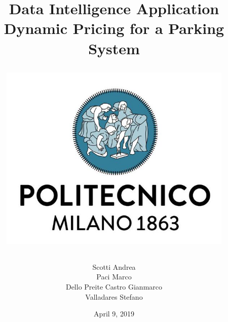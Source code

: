 \documentclass[12pt, a4paper]{article}
\begin{document}

\title{Data Intelligence Application\\ \vspace{1em}  {\textbf{Dynamic Pricing for a Parking System}} \\ 
	\vspace{1.5em}
\begin{figure}[H]
	\centering
	\includegraphics[scale=0.4]{Logo-PoliMi}
\end{figure}
}
\author{ Scotti Andrea \\ Paci Marco\\ Dello Preite Castro Gianmarco \\ Valladares Stefano}

\date{April 9, 2019}

\maketitle

\newpage
\tableofcontents

\newpage












\newpage
\appendix
\end{document}
